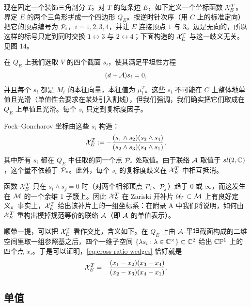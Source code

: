 现在固定一个装饰三角剖分 $T$。对 $T$ 的每条边 $E$，如下定义一个坐标函数 $\mathcal{X}^T_E$。界定 $E$ 的两个三角形拼成一个四边形 $Q_E$。按逆时针次序（用 $C$ 上的标准定向）把它的顶点编号为 $\mathcal{P}_i$，$i=1,2,3,4$，并让 $E$ 连接顶点 $1$ 与 $3$。边是无向的，所以这样的标号只定到同时交换 $1\leftrightarrow 3$ 与 $2\leftrightarrow 4$；下面构造的 $\mathcal{X}^T_E$ 与这一歧义无关。见图 14。%

在 $Q_E$ 上我们选取 $V$ 的四个截面 $s_i$，使其满足平坦性方程
\begin{equation}
(d+\mathcal{A})s_i = 0,
\end{equation}
并且每个 $s_i$ 都是 $M_i$ 的本征向量，本征值为 $\mu^T_i$。这些 $s_i$ 不可能在 $C$ 上整体地单值且光滑（单值性会要求在某处引入割线），但我们强调，我们确实把它们取成在 $Q_E$ 上单值且光滑。每个 $s_i$ 只定到复标度因子。

Fock--Goncharov 坐标由这些 $s_i$ 构造：
\begin{equation}\label{eq:cross-ratio-wedges}
\mathcal{X}^T_E := -\frac{(s_1\wedge s_2)(s_3\wedge s_4)}{(s_2\wedge s_3)(s_4\wedge s_1)},
\end{equation}
其中所有 $s_i$ 都在 $Q_E$ 中任取的同一个点 $\mathcal{P}_*$ 处取值。由于联络 $\mathcal{A}$ 取值于 $sl(2,\mathbb{C})$，这个量不依赖于 $\mathcal{P}_*$。此外，每个 $s_i$ 的复标度歧义在 $\mathcal{X}^T_E$ 中相互抵消。

函数 $\mathcal{X}^T_E$ 只在 $s_i\wedge s_j=0$ 时（对两个相邻顶点 $\mathcal{P}_i$、$\mathcal{P}_j$）趋于 $0$ 或 $\infty$，而这发生在 $\mathcal{M}$ 的一个余维 $1$ 子簇上。因此 $\mathcal{X}^T_E$ 在 Zariski 开补片 $\mathcal{U}_T\subset\mathcal{M}$ 上有良好定义。事实上，$\mathcal{X}^T_E$ 给出该补片上的一组坐标系\cite{MR2233852}：在附录 A%
中我们将说明，如何由 $\mathcal{X}^T_E$ 重构出模掉规范等价的联络 $\mathcal{A}$（即 $\mathcal{A}$ 的单值表示）。

顺带一提，可以把 $\mathcal{X}^T_E$ 看作交比，含义如下。在 $Q_E$ 上由 $\mathcal{A}$-平坦截面构成的二维空间里取一组参照基之后，四个一维子空间 $\{\lambda s_i:\lambda\in\mathbb{C}^\times\}\subset\mathbb{C}^2$ 给出 $\mathbb{C}\mathbb{P}^1$ 上的四个点 $x_i$。于是可以证明，\eqref{eq:cross-ratio-wedges} 恰好就是
\begin{equation}\label{eq:cross-ratio}
\mathcal{X}^T_E = -\frac{(x_1-x_2)(x_3-x_4)}{(x_2-x_3)(x_4-x_1)}.
\end{equation}

\subsection{单值}
\label{sec:monodromies}

